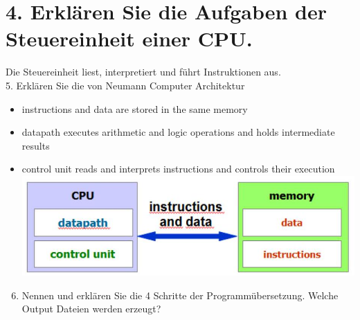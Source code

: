 \documentclass[10pt]{article}
\begin{document}
\section*{4. Erklären Sie die Aufgaben der Steuereinheit einer CPU.}
Die Steuereinheit liest, interpretiert und führt Instruktionen aus.\\
5. Erklären Sie die von Neumann Computer Architektur

\begin{itemize}
  \item instructions and data are stored in the same memory
  \item datapath executes arithmetic and logic operations and holds intermediate results
  \item control unit reads and interprets instructions and controls their execution\\
\includegraphics[max width=\textwidth, center]{2025_01_02_f240dc33b50f25226887g-2}
\end{itemize}

\begin{enumerate}
  \setcounter{enumi}{5}
  \item Nennen und erklären Sie die 4 Schritte der Programmübersetzung. Welche Output Dateien werden erzeugt?
\end{enumerate}
\end{document}
